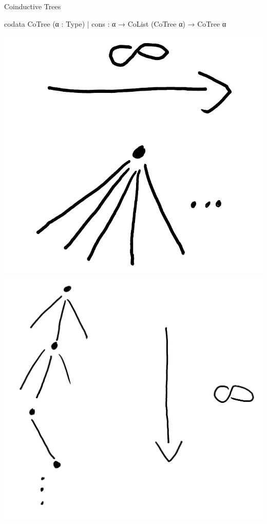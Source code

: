 \documentclass[t,12pt]{beamer}
\begin{document}
\begin{frame}[fragile]{Coinductive Trees}
    \vfill
\begin{leancode}
codata CoTree (α : Type)
  | cons : α → CoList (CoTree α) → CoTree α 
\end{leancode}

\medskip

\pause

{
    \hfill
    \includegraphics[scale=0.1]{tree_inf_wide.png}
    \hspace*{2.6cm}
    \includegraphics[scale=0.07]{tree_inf_deep.png}    
    \hfill
}



     
\end{frame}
    
\end{document}
